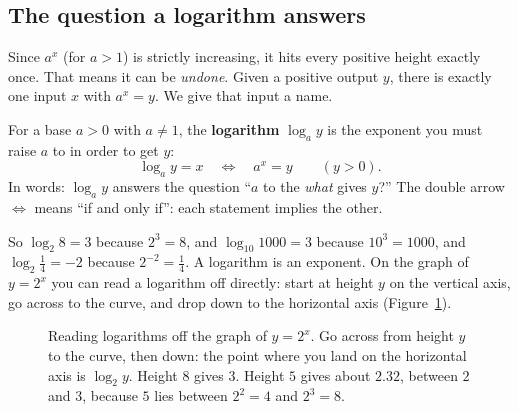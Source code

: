 \subsection{The question a logarithm answers}

Since $a^x$ (for $a>1$) is strictly increasing, it hits every positive height exactly once. That means it can be \emph{undone}. Given a positive output $y$, there is exactly one input $x$ with $a^x = y$. We give that input a name.

\begin{definition}[Logarithm]\label{ch03:def-log}
For a base $a>0$ with $a\neq 1$, the \textbf{logarithm} $\log_a y$ is the exponent you must raise $a$ to in order to get $y$:
\[
\log_a y = x \quad\Longleftrightarrow\quad a^x = y \qquad (y>0).
\]
In words: $\log_a y$ answers the question ``$a$ to the \emph{what} gives $y$?''
The double arrow $\Longleftrightarrow$ means ``if and only if'': each statement implies the other.
\end{definition}

So $\log_2 8 = 3$ because $2^3=8$, and $\log_{10}1000=3$ because $10^3=1000$, and $\log_2 \tfrac{1}{4} = -2$ because $2^{-2}=\tfrac14$. A logarithm is an exponent. On the graph of $y=2^x$ you can read a logarithm off directly: start at height $y$ on the vertical axis, go across to the curve, and drop down to the horizontal axis (Figure~\ref{ch03:fig-log-read}).

\begin{figure}[htbp]
\centering
{}
\caption{Reading logarithms off the graph of $y=2^x$. Go across from height $y$ to the curve, then down: the point where you land on the horizontal axis is $\log_2 y$. Height $8$ gives $3$. Height $5$ gives about $2.32$, between $2$ and $3$, because $5$ lies between $2^2=4$ and $2^3=8$.}
\label{ch03:fig-log-read}
\end{figure}


